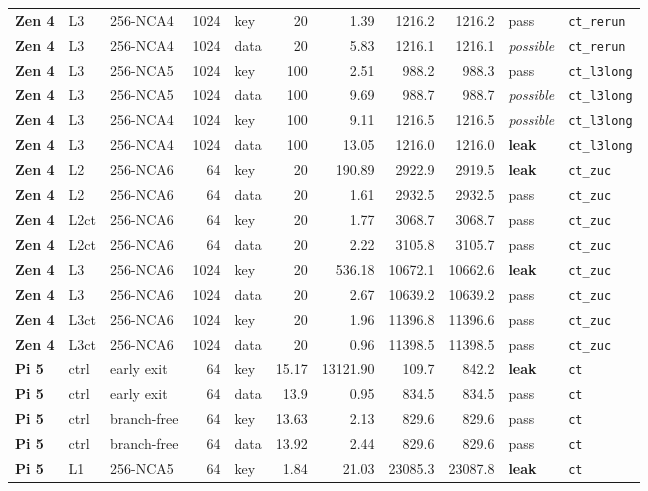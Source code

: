 {\begin{longtable}{@{}>{\bfseries}l l l r l r r r r l l@{}}
Zen 4 & L3 & 256-NCA4 & 1024 & key & 20 & 1.39 & 1216.2 & 1216.2 & pass & \texttt{ct\_rerun} \\
Zen 4 & L3 & 256-NCA4 & 1024 & data & 20 & 5.83 & 1216.1 & 1216.1 & \emph{possible} & \texttt{ct\_rerun} \\
\midrule
Zen 4 & L3 & 256-NCA5 & 1024 & key & 100 & 2.51 & 988.2 & 988.3 & pass & \texttt{ct\_l3long} \\
Zen 4 & L3 & 256-NCA5 & 1024 & data & 100 & 9.69 & 988.7 & 988.7 & \emph{possible} & \texttt{ct\_l3long} \\
Zen 4 & L3 & 256-NCA4 & 1024 & key & 100 & 9.11 & 1216.5 & 1216.5 & \emph{possible} & \texttt{ct\_l3long} \\
Zen 4 & L3 & 256-NCA4 & 1024 & data & 100 & 13.05 & 1216.0 & 1216.0 & \textbf{leak} & \texttt{ct\_l3long} \\
\midrule
Zen 4 & L2 & 256-NCA6 & 64 & key & 20 & 190.89 & 2922.9 & 2919.5 & \textbf{leak} & \texttt{ct\_zuc} \\
Zen 4 & L2 & 256-NCA6 & 64 & data & 20 & 1.61 & 2932.5 & 2932.5 & pass & \texttt{ct\_zuc} \\
Zen 4 & L2ct & 256-NCA6 & 64 & key & 20 & 1.77 & 3068.7 & 3068.7 & pass & \texttt{ct\_zuc} \\
Zen 4 & L2ct & 256-NCA6 & 64 & data & 20 & 2.22 & 3105.8 & 3105.7 & pass & \texttt{ct\_zuc} \\
Zen 4 & L3 & 256-NCA6 & 1024 & key & 20 & 536.18 & 10672.1 & 10662.6 & \textbf{leak} & \texttt{ct\_zuc} \\
Zen 4 & L3 & 256-NCA6 & 1024 & data & 20 & 2.67 & 10639.2 & 10639.2 & pass & \texttt{ct\_zuc} \\
Zen 4 & L3ct & 256-NCA6 & 1024 & key & 20 & 1.96 & 11396.8 & 11396.6 & pass & \texttt{ct\_zuc} \\
Zen 4 & L3ct & 256-NCA6 & 1024 & data & 20 & 0.96 & 11398.5 & 11398.5 & pass & \texttt{ct\_zuc} \\
\midrule
Pi 5 & ctrl & early exit & 64 & key & 15.17 & 13121.90 & 109.7 & 842.2 & \textbf{leak} & \texttt{ct} \\
Pi 5 & ctrl & early exit & 64 & data & 13.9 & 0.95 & 834.5 & 834.5 & pass & \texttt{ct} \\
Pi 5 & ctrl & branch-free & 64 & key & 13.63 & 2.13 & 829.6 & 829.6 & pass & \texttt{ct} \\
Pi 5 & ctrl & branch-free & 64 & data & 13.92 & 2.44 & 829.6 & 829.6 & pass & \texttt{ct} \\
Pi 5 & L1 & 256-NCA5 & 64 & key & 1.84 & 21.03 & 23085.3 & 23087.8 & \textbf{leak} & \texttt{ct} \\

\end{longtable}}
